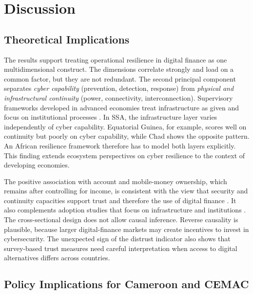 \documentclass[11pt,a4paper]{article}
\begin{document}
\section{Discussion}\label{sec:discussion}

\subsection{Theoretical Implications}

The results support treating operational resilience in digital finance as one multidimensional construct. The dimensions correlate strongly and load on a common factor, but they are not redundant. The second principal component separates \emph{cyber capability} (prevention, detection, response) from \emph{physical and infrastructural continuity} (power, connectivity, interconnection). Supervisory frameworks developed in advanced economies treat infrastructure as given and focus on institutional processes \citep{BCBS2021,EU2022DORA}. In SSA, the infrastructure layer varies independently of cyber capability. Equatorial Guinea, for example, scores well on continuity but poorly on cyber capability, while Chad shows the opposite pattern. An African resilience framework therefore has to model both layers explicitly. This finding extends ecosystem perspectives on cyber resilience \citep{Dupont2019,Linkov2018} to the context of developing economies.

The positive association with account and mobile-money ownership, which remains after controlling for income, is consistent with the view that security and continuity capacities support trust and therefore the use of digital finance \citep{Cao2018,Mvogo2026}. It also complements adoption studies that focus on infrastructure and institutions \citep{Mothobi2017,Lashitew2019}. The cross-sectional design does not allow causal inference. Reverse causality is plausible, because larger digital-finance markets may create incentives to invest in cybersecurity. The unexpected sign of the distrust indicator also shows that survey-based trust measures need careful interpretation when access to digital alternatives differs across countries.

\subsection{Policy Implications for Cameroon and CEMAC}
\end{document}
